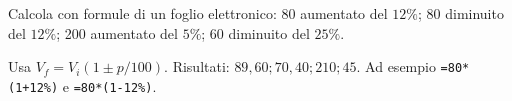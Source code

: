 
\begin{esercizio}
Calcola con formule di un foglio elettronico: 80 aumentato del $12\%$; 80 diminuito del $12\%$; 200 aumentato del $5\%$; 60 diminuito del $25\%$.
\end{esercizio}

\begin{soluzione}
Usa $V_f=V_i(1\pm p/100)$. Risultati: $89{,}60;70{,}40;210;45$. Ad esempio \texttt{=80*(1+12\%)} e \texttt{=80*(1-12\%)}.
\end{soluzione}
